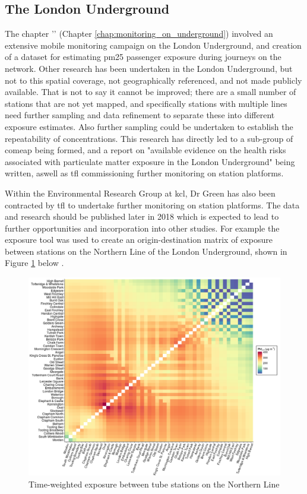 \subsection{The London Underground}
\label{london_underground_wrapup}

The chapter '' (Chapter \ref{chap:monitoring_on_underground}) involved an extensive mobile monitoring campaign on the London Underground, and creation of a dataset for estimating \gls{pm25} passenger exposure during journeys on the network. Other research has been undertaken in the London Underground, but not to this spatial coverage, not geographically referenced, and not made publicly available. That is not to say it cannot be improved; there are a small number of stations that are not yet mapped, and specifically stations with multiple lines need further sampling and data refinement to separate these into different exposure estimates. Also further sampling could be undertaken to establish the repeatability of concentrations. This research has directly led to a sub-group of \gls{comeap} being formed, and a report on "available evidence on the health risks associated with particulate matter exposure in the London Underground" being written, aswell as \gls{tfl} commissioning further monitoring on station platforms.

Within the Environmental Research Group at \gls{kcl}, Dr Green has also been contracted by \gls{tfl} to undertake further monitoring on station platforms. The data and research should be published later in 2018 which is expected to lead to further opportunities and incorporation into other studies. For example the exposure tool was used to create an origin-destination matrix of exposure between stations on the Northern Line of the London Underground, shown in Figure \ref{fig:time_weighted_tube_exposure} below .

\begin{figure}[H]
\centering
\includegraphics[scale=0.6]{images/time_weighted_tube_exposure}
\caption{Time-weighted exposure between tube stations on the Northern Line}
\label{fig:time_weighted_tube_exposure}
\end{figure}

